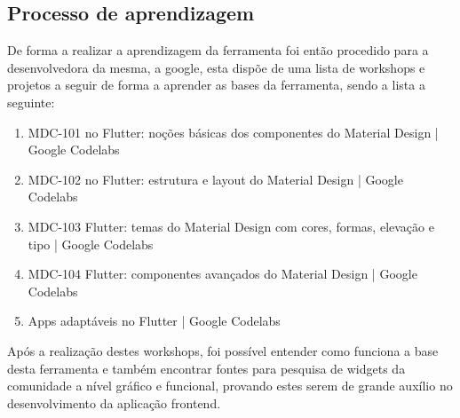\subsection{Processo de aprendizagem}
De forma a realizar a aprendizagem da ferramenta foi então procedido para a desenvolvedora da mesma, a google, esta dispõe de uma lista de workshops e projetos a seguir de forma a aprender as bases da ferramenta, sendo a lista a seguinte:

\begin{enumerate}
  \item MDC-101 no Flutter: noções básicas dos componentes do Material Design | Google Codelabs
  \item MDC-102 no Flutter: estrutura e layout do Material Design | Google Codelabs
  \item MDC-103 Flutter: temas do Material Design com cores, formas, elevação e tipo | Google Codelabs
  \item MDC-104 Flutter: componentes avançados do Material Design | Google Codelabs
  \item Apps adaptáveis no Flutter | Google Codelabs
\end{enumerate}

Após a realização destes workshops, foi possível entender como funciona a base desta ferramenta e também encontrar fontes para pesquisa de widgets da comunidade a nível gráfico e funcional, provando estes serem de grande auxílio no desenvolvimento da aplicação frontend.